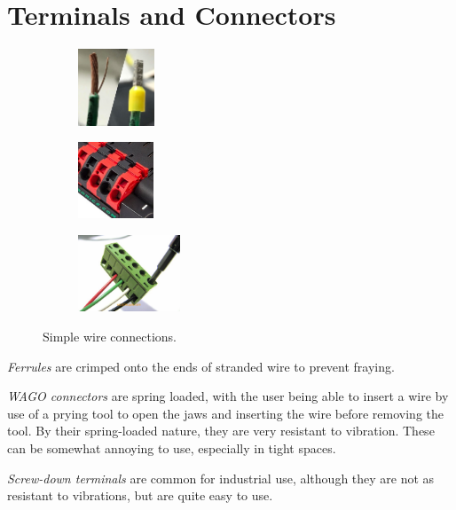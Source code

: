 \section{Terminals and Connectors}

\begin{figure}[H]
\begin{subfigure}[b]{.24\linewidth}
\includegraphics[height=0.9in]{imgs/connector_ferrule.jpeg}
\end{subfigure}\begin{subfigure}[b]{.24\linewidth}
\includegraphics[height=0.9in]{imgs/connector_wago.jpeg}
\end{subfigure}\begin{subfigure}[b]{.24\linewidth}
\includegraphics[height=0.9in]{imgs/connector_screwterm.jpeg}
\end{subfigure}
\caption{Simple wire connections.}
\end{figure}

\begin{asparaenum}[a)]
  \item \textit{Ferrules} are crimped onto the ends of stranded wire to prevent fraying.
  \item \textit{WAGO connectors} are spring loaded, with the user being able to insert a wire by use of a prying tool to open the jaws and inserting the wire before removing the tool. By their spring-loaded nature, they are very resistant to vibration. These can be somewhat annoying to use, especially in tight spaces.
  \item \textit{Screw-down terminals} are common for industrial use, although they are not as resistant to vibrations, but are quite easy to use.
\end{asparaenum} 


